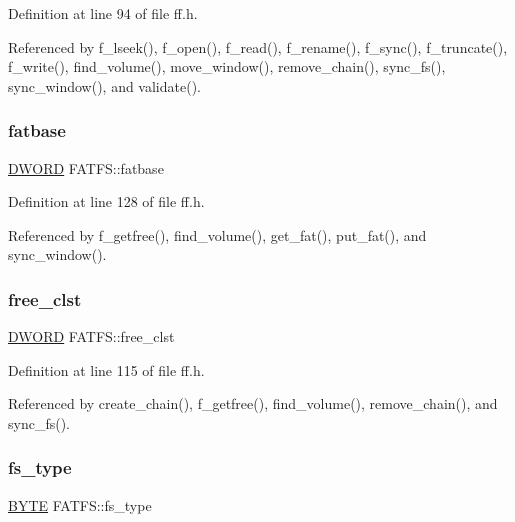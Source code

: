 Definition at line 94 of file ff.\+h.



Referenced by f\+\_\+lseek(), f\+\_\+open(), f\+\_\+read(), f\+\_\+rename(), f\+\_\+sync(), f\+\_\+truncate(), f\+\_\+write(), find\+\_\+volume(), move\+\_\+window(), remove\+\_\+chain(), sync\+\_\+fs(), sync\+\_\+window(), and validate().

\mbox{\label{structFATFS_a848fba02c4aabe02ef2984e578f33d64}} 
\subsubsection{\texorpdfstring{fatbase}{fatbase}}
{\footnotesize\ttfamily \hyperlink{integer_8h_ad342ac907eb044443153a22f964bf0af}{D\+W\+O\+RD} F\+A\+T\+F\+S\+::fatbase}



Definition at line 128 of file ff.\+h.



Referenced by f\+\_\+getfree(), find\+\_\+volume(), get\+\_\+fat(), put\+\_\+fat(), and sync\+\_\+window().

\mbox{\label{structFATFS_ac834248773bf338df807f0d7e6b6a579}} 
\subsubsection{\texorpdfstring{free\+\_\+clst}{free\_clst}}
{\footnotesize\ttfamily \hyperlink{integer_8h_ad342ac907eb044443153a22f964bf0af}{D\+W\+O\+RD} F\+A\+T\+F\+S\+::free\+\_\+clst}



Definition at line 115 of file ff.\+h.



Referenced by create\+\_\+chain(), f\+\_\+getfree(), find\+\_\+volume(), remove\+\_\+chain(), and sync\+\_\+fs().

\mbox{\label{structFATFS_add27d97babe807b573eac98a71dc4ae5}} 
\subsubsection{\texorpdfstring{fs\+\_\+type}{fs\_type}}
{\footnotesize\ttfamily \hyperlink{lz4_8c_a4ae1dab0fb4b072a66584546209e7d58}{B\+Y\+TE} F\+A\+T\+F\+S\+::fs\+\_\+type}



